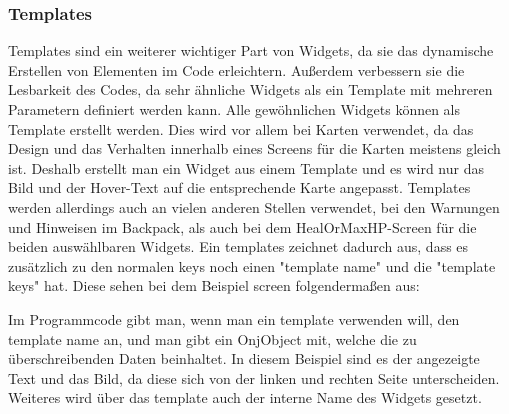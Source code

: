 \subsubsection{Templates}\label{sec:templates}
\renewcommand{\kapitelautor}{Autor: Felix Zwickelstorfer}
Templates sind ein weiterer wichtiger Part von Widgets, da sie das dynamische Erstellen von Elementen im Code erleichtern.
Außerdem verbessern sie die Lesbarkeit des Codes, da sehr ähnliche Widgets als ein Template mit mehreren Parametern definiert werden kann.
Alle gewöhnlichen Widgets können als Template erstellt werden.
Dies wird vor allem bei Karten verwendet, da das Design und das Verhalten innerhalb eines Screens für die Karten meistens gleich ist.
Deshalb erstellt man ein Widget aus einem Template und es wird nur das Bild und der Hover-Text auf die entsprechende Karte angepasst.
Templates werden allerdings auch an vielen anderen Stellen verwendet, \zB bei den Warnungen und Hinweisen im Backpack, als auch bei dem HealOrMaxHP-Screen für die beiden auswählbaren Widgets.
Ein templates zeichnet dadurch aus, dass es zusätzlich zu den normalen keys noch einen "template name" und die "template keys" hat.
Diese sehen bei dem Beispiel screen folgendermaßen aus:
Im Programmcode gibt man, wenn man ein template verwenden will, den template name an, und man gibt ein OnjObject mit, welche die zu überschreibenden Daten beinhaltet.
In diesem Beispiel sind es der angezeigte Text und das Bild, da diese sich von der linken und rechten Seite unterscheiden.
Weiteres wird über das template auch der interne Name des Widgets gesetzt.